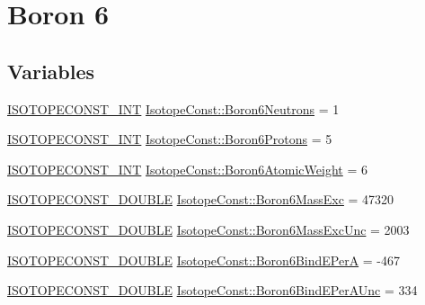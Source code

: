 \hypertarget{group___isotope_const-_boron-_b6}{}\section{Boron 6}
\label{group___isotope_const-_boron-_b6}
\subsection*{Variables}
\begin{DoxyCompactItemize}
\item 
\mbox{\hyperlink{group___isotope_const-_macros_ga5f18360b3e99483a35c32d789e62621c}{I\+S\+O\+T\+O\+P\+E\+C\+O\+N\+S\+T\+\_\+\+I\+NT}} \mbox{\hyperlink{group___isotope_const-_boron-_b6_ga2dc2e091406c49beec5ef00bf5fd0fab}{Isotope\+Const\+::\+Boron6\+Neutrons}} = 1
\item 
\mbox{\hyperlink{group___isotope_const-_macros_ga5f18360b3e99483a35c32d789e62621c}{I\+S\+O\+T\+O\+P\+E\+C\+O\+N\+S\+T\+\_\+\+I\+NT}} \mbox{\hyperlink{group___isotope_const-_boron-_b6_gaf130547f44eda547f4ca25c7e5bb85b2}{Isotope\+Const\+::\+Boron6\+Protons}} = 5
\item 
\mbox{\hyperlink{group___isotope_const-_macros_ga5f18360b3e99483a35c32d789e62621c}{I\+S\+O\+T\+O\+P\+E\+C\+O\+N\+S\+T\+\_\+\+I\+NT}} \mbox{\hyperlink{group___isotope_const-_boron-_b6_gaeb620c263dbb9c36c8a6edd8ff32da41}{Isotope\+Const\+::\+Boron6\+Atomic\+Weight}} = 6
\item 
\mbox{\hyperlink{group___isotope_const-_macros_ga8f45a7272ce02c0b4c65c44636ed719a}{I\+S\+O\+T\+O\+P\+E\+C\+O\+N\+S\+T\+\_\+\+D\+O\+U\+B\+LE}} \mbox{\hyperlink{group___isotope_const-_boron-_b6_ga03a13cf0900863afb4fbff7b2b734d06}{Isotope\+Const\+::\+Boron6\+Mass\+Exc}} = 47320
\item 
\mbox{\hyperlink{group___isotope_const-_macros_ga8f45a7272ce02c0b4c65c44636ed719a}{I\+S\+O\+T\+O\+P\+E\+C\+O\+N\+S\+T\+\_\+\+D\+O\+U\+B\+LE}} \mbox{\hyperlink{group___isotope_const-_boron-_b6_ga5305b6c6cdfe235a0eb50522cfba7804}{Isotope\+Const\+::\+Boron6\+Mass\+Exc\+Unc}} = 2003
\item 
\mbox{\hyperlink{group___isotope_const-_macros_ga8f45a7272ce02c0b4c65c44636ed719a}{I\+S\+O\+T\+O\+P\+E\+C\+O\+N\+S\+T\+\_\+\+D\+O\+U\+B\+LE}} \mbox{\hyperlink{group___isotope_const-_boron-_b6_gab99728bfe442fabfe30ac7b047e2be8e}{Isotope\+Const\+::\+Boron6\+Bind\+E\+PerA}} = -\/467
\item 
\mbox{\hyperlink{group___isotope_const-_macros_ga8f45a7272ce02c0b4c65c44636ed719a}{I\+S\+O\+T\+O\+P\+E\+C\+O\+N\+S\+T\+\_\+\+D\+O\+U\+B\+LE}} \mbox{\hyperlink{group___isotope_const-_boron-_b6_gabe76b4884683f5e97c7b62ca446decb3}{Isotope\+Const\+::\+Boron6\+Bind\+E\+Per\+A\+Unc}} = 334

\end{DoxyCompactItemize}
